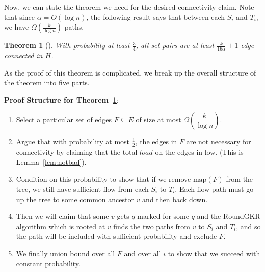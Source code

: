\documentclass[12pt]{article}
\newtheorem{theorem}{Theorem}
\begin{document}
Now, we can state the theorem we need for the desired connectivity claim. Note that since $\alpha = O(\log n)$, the following result says that between each $S_i$ and $T_i$, we have $\Omega(\frac{k}{\log n})$ paths.

\begin{theorem}[\cite{ssc}]
\label{theorem:connected}
With probability at least $\frac{3}{4}$, all set pairs are at least $\frac{k}{16\alpha} + 1$ edge connected in $H$. 
\end{theorem}

As the proof of this theorem is complicated, we break up the overall structure of the theorem into five parts.

\textbf{Proof Structure for Theorem~\ref{theorem:connected}}:
\begin{enumerate}
\item Select a particular set of edges $F \subseteq E$ of size at most $\Omega(\dfrac{k}{\log n})$. 
\item Argue that with probability at most $\frac{1}{2}$, the edges in $F$ are not necessary for connectivity by claiming that the total $load$ on the edges in low. (This is Lemma~\ref{lem:notbad}). 
\item Condition on this probability to show that if we remove $\text{map}(F)$ from the tree, we still have sufficient flow from each $S_i$ to $T_i$. Each flow path must go up the tree to some common ancestor $v$ and then back down.
\item Then we will claim that some $v$ gets $q$-marked for some $q$ and the RoundGKR algorithm which is rooted at $v$ finds the two paths from $v$ to $S_i$ and $T_i$, and so the path will be included with sufficient probability and exclude $F$.
\item We finally union bound over all $F$ and over all $i$ to show that we succeed with constant probability. 
\end{enumerate}
\end{document}
